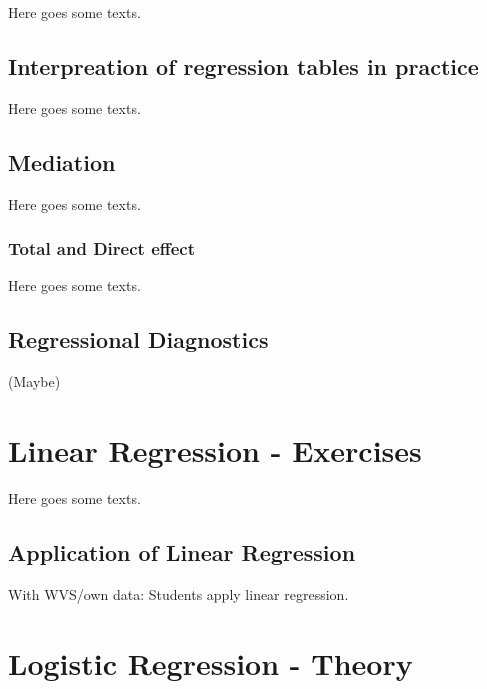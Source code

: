 \documentclass[
]{book}
\begin{document}
Here goes some texts.

\hypertarget{interpreation-of-regression-tables-in-practice}{%
\section{Interpreation of regression tables in practice}\label{interpreation-of-regression-tables-in-practice}}

Here goes some texts.

\hypertarget{mediation-1}{%
\section{Mediation}\label{mediation-1}}

Here goes some texts.

\hypertarget{total-and-direct-effect}{%
\subsection{Total and Direct effect}\label{total-and-direct-effect}}

Here goes some texts.

\hypertarget{regressional-diagnostics}{%
\section{Regressional Diagnostics}\label{regressional-diagnostics}}

(Maybe)

\hypertarget{lin-e}{%
\chapter{Linear Regression - Exercises}\label{lin-e}}

Here goes some texts.

\hypertarget{application-of-linear-regression}{%
\section{Application of Linear Regression}\label{application-of-linear-regression}}

With WVS/own data: Students apply linear regression.

\hypertarget{log-t}{%
\chapter{Logistic Regression - Theory}\label{log-t}}
\end{document}
